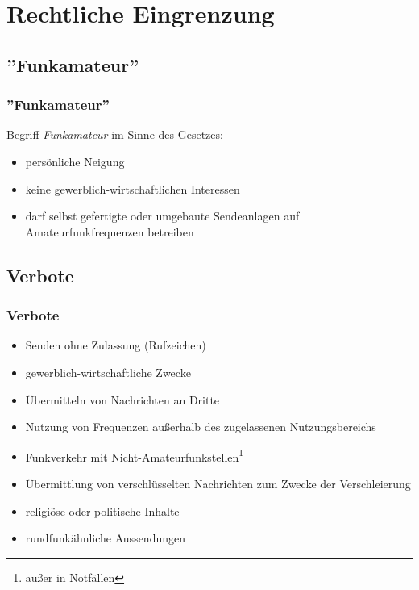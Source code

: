 \section{Rechtliche Eingrenzung}

\subsection{''Funkamateur''}

\begin{frame}
    \frametitle{''Funkamateur''}

    Begriff \emph{Funkamateur} im Sinne des Gesetzes:

    \begin{itemize}
        \item persönliche Neigung
        \item keine gewerblich-wirtschaftlichen Interessen
        \item darf selbst gefertigte oder umgebaute Sendeanlagen auf Amateurfunkfrequenzen betreiben
    \end{itemize}

\end{frame}

\subsection{Verbote}

\begin{frame}
    \frametitle{Verbote}

    \begin{itemize}[<+->]
        \item Senden ohne Zulassung (Rufzeichen)
        \item gewerblich-wirtschaftliche Zwecke
        \item Übermitteln von Nachrichten an Dritte
        \item Nutzung von Frequenzen außerhalb des zugelassenen Nutzungsbereichs
        \item Funkverkehr mit Nicht-Amateurfunkstellen\footnote{außer in Notfällen}
        \item Übermittlung von verschlüsselten Nachrichten zum Zwecke der Verschleierung
        \item religiöse oder politische Inhalte
        \item rundfunkähnliche Aussendungen
    \end{itemize}

\end{frame}

